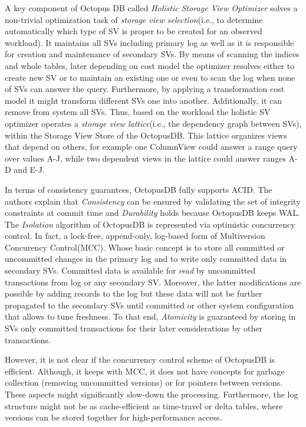 \documentclass[10pt, conference, compsocconf]{IEEEtran}
\begin{document}
A key component of Octopus DB called \textit{Holistic Storage View Optimizer} solves a non-trivial optimization task of \textit{storage view selection}(i.e., to determine automatically which type of SV is proper to be created for an observed workload). It maintains all SVs including primary log as well as it is responsible for creation and maintenance of secondary SVs. By means of scanning the indices and whole tables, later  depending on cost model the optimizer resolves either to create new SV or to maintain an existing one or even to scan the log when none of SVs can answer the query. Furthermore, by applying a transformation cost model it might transform different SVs one into another. Additionally, it can remove from system all SVs. Thus, based on the workload the holistic SV optimizer operates a \textit{storage view lattice}(i.e., the dependency graph between SVs), within the Storage View Store of the OctopusDB. This lattice organizes views that depend on others, for example one ColumnView could answer a range query over values A-J, while two dependent views in the lattice could answer ranges A-D and E-J.

In terms of consistency guarantees, OctopusDB fully supports ACID. The authors explain that \textit{Consistency} can be ensured by validating the set of integrity constraints at commit time and \textit{Durability} holds because OctopusDB keeps WAL. The \textit{Isolation} algorithm of OctopusDB is represented via optimistic concurrency control. In fact, a lock-free, append-only, log-based form of Multiversion Concurency Control(MCC). Whose basic concept is to store all committed or uncommitted changes in the primary log and to write only committed data in secondary SVs. Committed data is available for \textit{read} by uncommitted transactions from log or any secondary SV. Moreover, the latter modifications are possible by adding records to the log but these data will not be further propagated to the secondary SVs until committed or other system configuration that allows to tune freshness. To that end, \textit{Atomicity} is guaranteed by storing in SVs only committed transactions for their later considerations by other transactions.

However, it is not clear if the concurrency control scheme of OctopusDB is efficient. Although, it keeps with MCC, it does not have concepts for garbage collection (removing uncommitted versions) or for pointers between versions. These aspects might significantly slow-down the processing. Furthermore, the log structure might not be as cache-efficient as time-travel or delta tables, where versions can be stored together for high-performance access.
\end{document}
